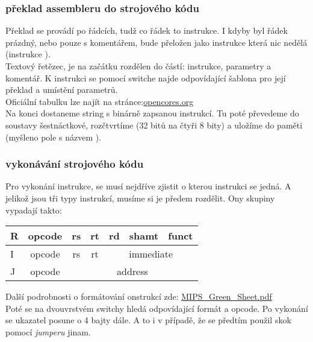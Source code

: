 \documentclass[a4paper,titlepage]{article}
\begin{document}
	
	
	\subsubsection{překlad assembleru do strojového kódu}
		Překlad se provádí po řádcích, tudž co řádek to instrukce.
		I kdyby byl řádek prázdný, nebo pouze s komentářem, bude přeložen jako instrukce která nic nedělá (instrukce ).\\
				
		Textový řetězec, je na začátku rozdělen do částí: instrukce, parametry a komentář.
		K instrukci se pomocí switche najde odpovídající šablona pro její překlad a umístění parametrů.\\
		\small{Oficiální tabulku lze najít na stránce:\href{https://opencores.org/project,plasma,opcodes#opcodes}{opencores.org}}\\
		
		Na konci dostaneme string s binárně zapsanou instrukcí.
		Tu poté převedeme do soustavy šestnáctkové, rozčtvrtíme (32 bitů na čtyři 8 bity) a uložíme do paměti (myšleno pole s názvem ).
	
	\subsubsection{vykonávání strojového kódu}
		Pro vykonání instrukce, se musí nejdříve zjistit o kterou instrukci se jedná.
		A jelikož jsou tři typy instrukcí, musíme si je předem rozdělit.
		Ony skupiny vypadají takto:
		
		\begin{table}[ht]
			\centering
			\label{my-label}
			\begin{tabular}{|l|c|c|c|c|c|c|}
				\hline
				R & opcode & rs & rt & rd & shamt & funct \\ \hline
				I & opcode & rs & rt & \multicolumn{3}{c|}{immediate} \\ \hline
				J & opcode & \multicolumn{5}{c|}{address} \\ \hline
			\end{tabular}
		\end{table}
		Další podrobnosti o formátování onstrukcí zde:
		\href{http://www-inst.eecs.berkeley.edu/~cs61c/resources/MIPS_Green_Sheet.pdf}{MIPS\_Green\_Sheet.pdf}\cite{greenSheet}\\

		Poté se na dvouvrstvém switchy hledá odpovídající formát a opcode. Po vykonání se ukazatel  posune o 4 bajty dále.
		A to i v případě, že se předtím použil skok pomocí \textit{jumperu} jinam. 
		
\end{document}
